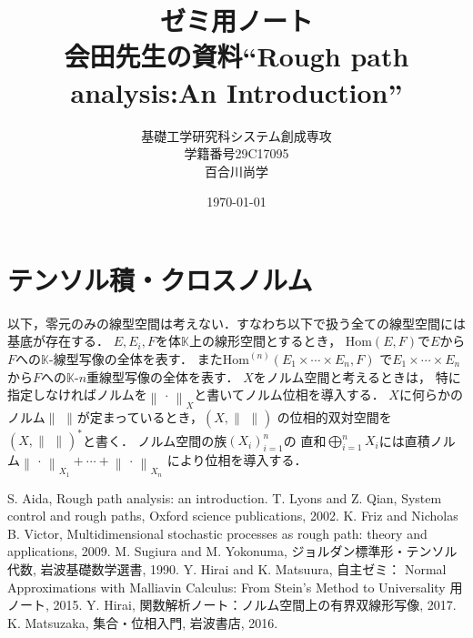 \documentclass[a4j,10.5pt,oneside,openany]{jsbook}
\title{ゼミ用ノート\\会田先生の資料``Rough path analysis:An Introduction''}
\author{基礎工学研究科システム創成専攻\\学籍番号29C17095\\百合川尚学}
\date{\today}
\theoremstyle{mystyle}
\def\Norm#1#2{\left\|\, #1\, \right\|_{#2}} %
\def\K{\mathbb{K}} %
\def\Hom#1#2{\mathrm{Hom} \left(#1,#2\right)} %
\def\Ln#1#2#3{\mathrm{Hom}^{(#3)} \left(#1,#2\right)} %
\begin{document}
\maketitle
\tableofcontents
\frontmatter
\mainmatter

\chapter{}
	
	
	

\appendix
\chapter{テンソル積・クロスノルム}
	以下，零元のみの線型空間は考えない．すなわち以下で扱う全ての線型空間には基底が存在する．
	$E,E_i,F$を体$\K$上の線形空間とするとき，
	$\Hom{E}{F}$で$E$から$F$への$\K$-線型写像の全体を表す．
	また$\Ln{E_1 \times \cdots \times E_n}{F}{n}$
	で$E_1 \times \cdots \times E_n$から$F$への$\K$-$n$重線型写像の全体を表す．
	$X$をノルム空間と考えるときは，
	特に指定しなければノルムを$\Norm{\cdot}{X}$と書いてノルム位相を導入する．
	$X$に何らかのノルム$\Norm{}{}$が定まっているとき，$(X,\Norm{}{})$
	の位相的双対空間を$(X,\Norm{}{})^*$と書く．
	ノルム空間の族$(X_i)_{i=1}^{n}$の
	直和$\bigoplus_{i=1}^n X_i$には直積ノルム$\Norm{\cdot}{X_1} + \cdots + \Norm{\cdot}{X_n}$
	により位相を導入する．
	
	
	
	
	
	

\begin{thebibliography}{数字}
   S. Aida, Rough path analysis: an introduction.
   T. Lyons and Z. Qian, System control and rough paths, Oxford science publications, 2002.
   K. Friz and Nicholas B. Victor, Multidimensional stochastic processes as rough path: theory and applications, 2009.
   M. Sugiura and M. Yokonuma, ジョルダン標準形・テンソル代数, 岩波基礎数学選書, 1990.
   Y. Hirai and K. Matsuura, 自主ゼミ： Normal Approximations with Malliavin Calculus: From Stein's Method to Universality 用ノート, 2015. 
   Y. Hirai, 関数解析ノート：ノルム空間上の有界双線形写像, 2017.
   K. Matsuzaka, 集合・位相入門, 岩波書店, 2016.
\end{thebibliography}

\printindex
\end{document}
